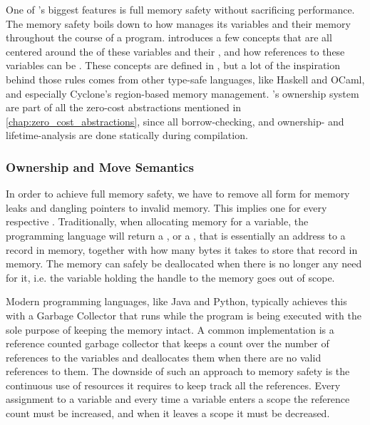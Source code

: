 One of \rust's biggest features is full memory safety \cite{web:rust_book_unsafe} without sacrificing performance.
The memory safety boils down to how \rust manages its variables and their memory throughout the course of a program.
\rust introduces a few concepts that are all centered around the  of these variables and their , and how references to these variables can be .
These concepts are defined in \rust, but a lot of the inspiration behind those rules comes from other type-safe languages, like Haskell and OCaml, and especially Cyclone's \cite{Grossman2002,Swamy2006} region-based memory management.
\rust's ownership system are part of all the zero-cost abstractions mentioned in \autoref{chap:zero_cost_abstractions}, since all borrow-checking, and ownership- and lifetime-analysis are done statically during compilation.

\subsubsection{Ownership and Move Semantics}
\label{sec:back:rust:own}

In order to achieve full memory safety, we have to remove all form for memory leaks and dangling pointers to invalid memory.
This implies one  for every respective .
Traditionally, when allocating memory for a variable, the programming language will return a ,  or a , that is essentially an address to a record in memory, together with how many bytes it takes to store that record in memory.
The memory can safely be deallocated when there is no longer any need for it, i.e. the variable holding the handle to the memory goes out of scope.

Modern programming languages, like Java and Python, typically achieves this with a Garbage Collector that runs while the program is being executed with the sole purpose of keeping the memory intact.
A common implementation is a reference counted garbage collector that keeps a count over the number of references to the variables and deallocates them when there are no valid references to them.
The downside of such an approach to memory safety is the continuous use of resources it requires to keep track all the references.
Every assignment to a variable and every time a variable enters a scope the reference count must be increased, and when it leaves a scope it must be decreased.


